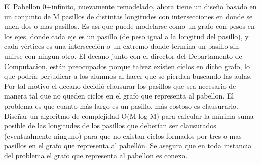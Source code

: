 El Pabellon 0+infinito, nuevamente remodelado, ahora tiene un diseño basado en un conjunto de M
pasillos de distintas longitudes con intersecciones en donde se unen dos o mas pasillos. Es ası que puede
modelarse como un grafo con pesos en los ejes, donde cada eje es un pasillo (de peso igual a la longitud del
pasillo), y cada vértices es una intersección o un extremo donde termina un pasillo sin unirse con ningun
otro. El decano junto con el director del Departamento de Computacion, están preocupados porque talvez
existen ciclos en dicho grafo, lo que podría perjudicar a los alumnos al hacer que se pierdan buscando
las aulas. Por tal motivo el decano decidió clausurar los pasillos que sea necesario de manera tal que no
queden ciclos en el grafo que representa al pabellon. El problema es que cuanto más largo es un pasillo,
más costoso es clausurarlo. 
Diseñar un algoritmo de complejidad O(M log M) para calcular la mínima
suma posible de las longitudes de los pasillos que deberían ser clausurados (eventualmente ninguno) para
que no existan ciclos formados por tres o mas pasillos en el grafo que representa al pabellón. Se asegura
que en toda instancia del problema el grafo que representa al pabellon es conexo.
